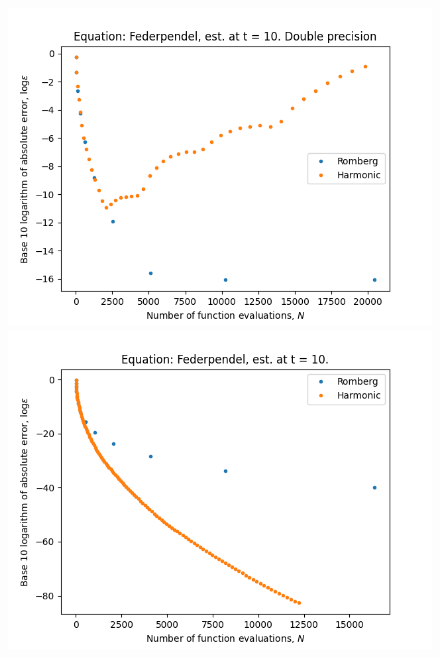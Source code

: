 \begin{figure}[H]
\centering
\begin{minipage}{0.45\textwidth}
\centering
\includegraphics[scale=0.45]{../results/emr_plots/federpendel_10.png}
\end{minipage}
\begin{minipage}{0.45\textwidth}
\centering
\includegraphics[scale=0.45]{../results/emr_plots/federpendel_10_hp.png}
\end{minipage}
\end{figure}


